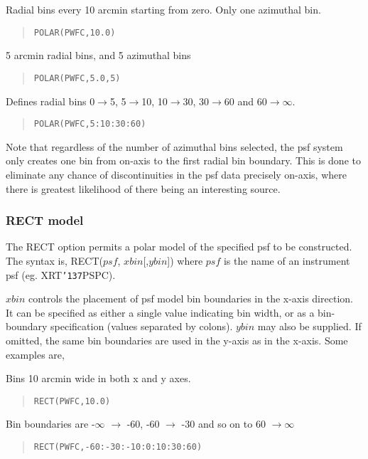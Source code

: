 \documentclass{book}
\renewcommand{\_}{{\tt\char'137}}     %
\begin{document}
Radial bins every 10 arcmin starting from zero. Only one azimuthal bin.
\begin{quote}\begin{verbatim}
POLAR(PWFC,10.0)
\end{verbatim}\end{quote}
5 arcmin radial bins, and 5 azimuthal bins
\begin{quote}\begin{verbatim}
POLAR(PWFC,5.0,5)
\end{verbatim}\end{quote}
Defines radial bins 0$\rightarrow$5, 5$\rightarrow$10, 10$\rightarrow$30, 30$\rightarrow$60 and 60$\rightarrow$$\infty$.
\begin{quote}\begin{verbatim}
POLAR(PWFC,5:10:30:60)
\end{verbatim}\end{quote}
Note that regardless of the number of azimuthal bins selected,
the psf system only creates one bin from on-axis to the first
radial bin boundary. This is done to eliminate any chance of
discontinuities in the psf data precisely on-axis, where there
is greatest likelihood of there being an interesting source.

\subsubsection{RECT model}
The RECT option permits a polar model of the specified psf
to be constructed. The syntax is, RECT($psf$, $xbin$[,$ybin$])
where $psf$ is the name of an instrument psf (eg. XRT\_PSPC).

$xbin$ controls the placement of psf model bin boundaries in the
x-axis direction. It can be specified as either a single value
indicating bin width, or as a bin-boundary specification (values
separated by colons). $ybin$ may also be supplied. If omitted,
the same bin boundaries are used in the y-axis as in the x-axis.
Some examples are,

Bins 10 arcmin wide in both x and y axes.
\begin{quote}\begin{verbatim}
RECT(PWFC,10.0)
\end{verbatim}\end{quote}
Bin boundaries are -$\infty$ $\rightarrow$ -60, -60 $\rightarrow$ -30 and so on to 60 $\rightarrow$$\infty$
\begin{quote}\begin{verbatim}
RECT(PWFC,-60:-30:-10:0:10:30:60)
\end{verbatim}\end{quote}
\end{document}
